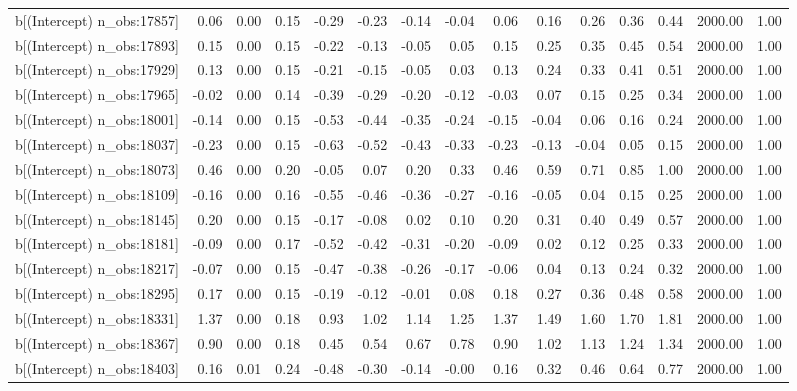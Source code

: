 \begin{table}[ht]
\begin{tabular}{rrrrrrrrrrrrrrr}
  b[(Intercept) n\_obs:17857] & 0.06 & 0.00 & 0.15 & -0.29 & -0.23 & -0.14 & -0.04 & 0.06 & 0.16 & 0.26 & 0.36 & 0.44 & 2000.00 & 1.00 \\ 
  b[(Intercept) n\_obs:17893] & 0.15 & 0.00 & 0.15 & -0.22 & -0.13 & -0.05 & 0.05 & 0.15 & 0.25 & 0.35 & 0.45 & 0.54 & 2000.00 & 1.00 \\ 
  b[(Intercept) n\_obs:17929] & 0.13 & 0.00 & 0.15 & -0.21 & -0.15 & -0.05 & 0.03 & 0.13 & 0.24 & 0.33 & 0.41 & 0.51 & 2000.00 & 1.00 \\ 
  b[(Intercept) n\_obs:17965] & -0.02 & 0.00 & 0.14 & -0.39 & -0.29 & -0.20 & -0.12 & -0.03 & 0.07 & 0.15 & 0.25 & 0.34 & 2000.00 & 1.00 \\ 
  b[(Intercept) n\_obs:18001] & -0.14 & 0.00 & 0.15 & -0.53 & -0.44 & -0.35 & -0.24 & -0.15 & -0.04 & 0.06 & 0.16 & 0.24 & 2000.00 & 1.00 \\ 
  b[(Intercept) n\_obs:18037] & -0.23 & 0.00 & 0.15 & -0.63 & -0.52 & -0.43 & -0.33 & -0.23 & -0.13 & -0.04 & 0.05 & 0.15 & 2000.00 & 1.00 \\ 
  b[(Intercept) n\_obs:18073] & 0.46 & 0.00 & 0.20 & -0.05 & 0.07 & 0.20 & 0.33 & 0.46 & 0.59 & 0.71 & 0.85 & 1.00 & 2000.00 & 1.00 \\ 
  b[(Intercept) n\_obs:18109] & -0.16 & 0.00 & 0.16 & -0.55 & -0.46 & -0.36 & -0.27 & -0.16 & -0.05 & 0.04 & 0.15 & 0.25 & 2000.00 & 1.00 \\ 
  b[(Intercept) n\_obs:18145] & 0.20 & 0.00 & 0.15 & -0.17 & -0.08 & 0.02 & 0.10 & 0.20 & 0.31 & 0.40 & 0.49 & 0.57 & 2000.00 & 1.00 \\ 
  b[(Intercept) n\_obs:18181] & -0.09 & 0.00 & 0.17 & -0.52 & -0.42 & -0.31 & -0.20 & -0.09 & 0.02 & 0.12 & 0.25 & 0.33 & 2000.00 & 1.00 \\ 
  b[(Intercept) n\_obs:18217] & -0.07 & 0.00 & 0.15 & -0.47 & -0.38 & -0.26 & -0.17 & -0.06 & 0.04 & 0.13 & 0.24 & 0.32 & 2000.00 & 1.00 \\ 
  b[(Intercept) n\_obs:18295] & 0.17 & 0.00 & 0.15 & -0.19 & -0.12 & -0.01 & 0.08 & 0.18 & 0.27 & 0.36 & 0.48 & 0.58 & 2000.00 & 1.00 \\ 
  b[(Intercept) n\_obs:18331] & 1.37 & 0.00 & 0.18 & 0.93 & 1.02 & 1.14 & 1.25 & 1.37 & 1.49 & 1.60 & 1.70 & 1.81 & 2000.00 & 1.00 \\ 
  b[(Intercept) n\_obs:18367] & 0.90 & 0.00 & 0.18 & 0.45 & 0.54 & 0.67 & 0.78 & 0.90 & 1.02 & 1.13 & 1.24 & 1.34 & 2000.00 & 1.00 \\ 
  b[(Intercept) n\_obs:18403] & 0.16 & 0.01 & 0.24 & -0.48 & -0.30 & -0.14 & -0.00 & 0.16 & 0.32 & 0.46 & 0.64 & 0.77 & 2000.00 & 1.00 \\ 

\end{tabular}
\end{table}
